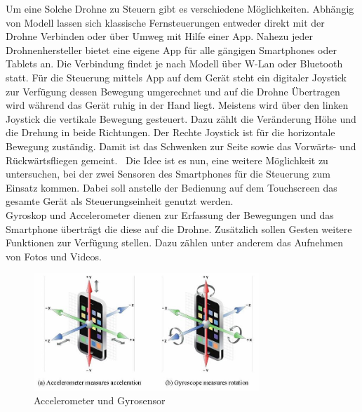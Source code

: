 \documentclass{article}
\begin{document}
Um eine Solche Drohne zu Steuern gibt es verschiedene Möglichkeiten. Abhängig von Modell lassen sich klassische Fernsteuerungen entweder direkt mit der Drohne Verbinden oder über Umweg mit Hilfe einer App. Nahezu jeder Drohnenhersteller bietet eine eigene App für alle gängigen Smartphones oder Tablets an. Die Verbindung findet je nach Modell über W-Lan oder Bluetooth statt. Für die Steuerung mittels App auf dem Gerät steht ein digitaler Joystick zur Verfügung dessen Bewegung umgerechnet und auf die Drohne Übertragen wird während das Gerät ruhig in der Hand liegt. Meistens wird über den linken Joystick die vertikale Bewegung gesteuert. Dazu zählt die Veränderung Höhe und die Drehung in beide Richtungen. Der Rechte Joystick ist für die horizontale Bewegung zuständig. Damit ist das Schwenken zur Seite sowie das Vorwärts- und Rückwärtsfliegen gemeint. 
\ Die Idee ist es nun, eine weitere Möglichkeit zu untersuchen, bei der zwei Sensoren des Smartphones für die Steuerung zum Einsatz kommen. Dabei soll anstelle der Bedienung auf dem Touchscreen das gesamte Gerät als Steuerungseinheit genutzt werden. \\Gyroskop und Accelerometer dienen zur Erfassung der Bewegungen und das Smartphone überträgt die diese auf die Drohne. Zusätzlich sollen Gesten weitere Funktionen zur Verfügung stellen. Dazu zählen unter anderem das Aufnehmen von Fotos und Videos.
\begin{figure}[htb]
\begin{minipage}[b]{1.0\linewidth}
  \centering
\centerline{\includegraphics[width= 85mm]{gyro.jpg}}
\end{minipage}
\caption{Accelerometer und Gyrosensor}
\label{fig:gyro}
\end{figure}
\end{document}
